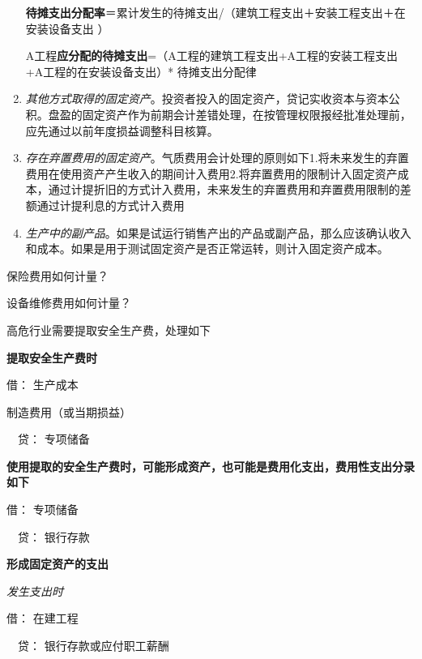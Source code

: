 \documentclass[UTF8,12pt]{ctexart}
\newenvironment{Dr}{\noindent 借：}{\par}
\newenvironment{Cr}{\noindent \ \ 贷：}{\par}
\numberwithin{equation}{section} %
\numberwithin{figure}{section}
\numberwithin{table}{section}
\begin{document}
\begin{enumerate}
		\textbf{待摊支出分配率}＝累计发生的待摊支出/（建筑工程支出＋安装工程支出＋在安装设备支出 ）
		
		A工程\textbf{应分配的待摊支出}=（A工程的建筑工程支出+A工程的安装工程支出+A工程的在安装设备支出）* 待摊支出分配律
		
		
		\item \textit{其他方式取得的固定资产}。投资者投入的固定资产，贷记实收资本与资本公积。盘盈的固定资产作为前期会计差错处理，在按管理权限报经批准处理前，应先通过以前年度损益调整科目核算。
		
		\item \textit{存在弃置费用的固定资产}。气质费用会计处理的原则如下1.将未来发生的弃置费用在使用资产产生收入的期间计入费用2.将弃置费用的限制计入固定资产成本，通过计提折旧的方式计入费用，未来发生的弃置费用和弃置费用限制的差额通过计提利息的方式计入费用
		
		
		
		\item \textit{生产中的副产品}。如果是试运行销售产出的产品或副产品，那么应该确认收入和成本。如果是用于测试固定资产是否正常运转，则计入固定资产成本。
		
	\end{enumerate}
	
	保险费用如何计量？
	
	设备维修费用如何计量？
	
	高危行业需要提取安全生产费，处理如下
	
	\textbf{提取安全生产费时}
	
	\begin{Dr}
		生产成本
		
		制造费用（或当期损益）
	\end{Dr}
	\begin{Cr}
		专项储备
	\end{Cr}
	
	
	\textbf{使用提取的安全生产费时，可能形成资产，也可能是费用化支出，费用性支出分录如下}
	
	\begin{Dr}
		专项储备
	\end{Dr}
	\begin{Cr}
		银行存款
	\end{Cr}
	
	\textbf{形成固定资产的支出}
	
	\textit{发生支出时}
	
	\begin{Dr}
		在建工程
	\end{Dr}
	\begin{Cr}
		银行存款或应付职工薪酬
	\end{Cr}
	
\end{document}
